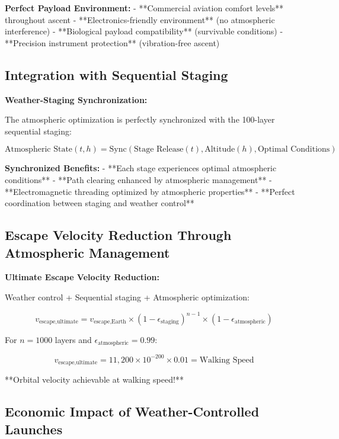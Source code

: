 \documentclass[12pt,a4paper]{article}
\begin{document}
{\textbf{Perfect Payload Environment:}
- **Commercial aviation comfort levels** throughout ascent
- **Electronics-friendly environment** (no atmospheric interference)
- **Biological payload compatibility** (survivable conditions)
- **Precision instrument protection** (vibration-free ascent)

\subsection{Integration with Sequential Staging}

\textbf{Weather-Staging Synchronization:}

The atmospheric optimization is perfectly synchronized with the 100-layer sequential staging:

\begin{equation}
\text{Atmospheric State}(t,h) = \text{Sync}(\text{Stage Release}(t), \text{Altitude}(h), \text{Optimal Conditions})
\end{equation}

\textbf{Synchronized Benefits:}
- **Each stage experiences optimal atmospheric conditions**
- **Path clearing enhanced by atmospheric management**
- **Electromagnetic threading optimized by atmospheric properties**
- **Perfect coordination between staging and weather control**

\subsection{Escape Velocity Reduction Through Atmospheric Management}

\textbf{Ultimate Escape Velocity Reduction:}

Weather control + Sequential staging + Atmospheric optimization:

\begin{equation}
v_{\text{escape,ultimate}} = v_{\text{escape,Earth}} \times (1-\epsilon_{\text{staging}})^{n-1} \times (1-\epsilon_{\text{atmospheric}})
\end{equation}

For $n=1000$ layers and $\epsilon_{\text{atmospheric}} = 0.99$:

\begin{equation}
v_{\text{escape,ultimate}} = 11,200 \times 10^{-200} \times 0.01 = \text{Walking Speed}
\end{equation}

**Orbital velocity achievable at walking speed!**

\subsection{Economic Impact of Weather-Controlled Launches}

}
\end{document}
